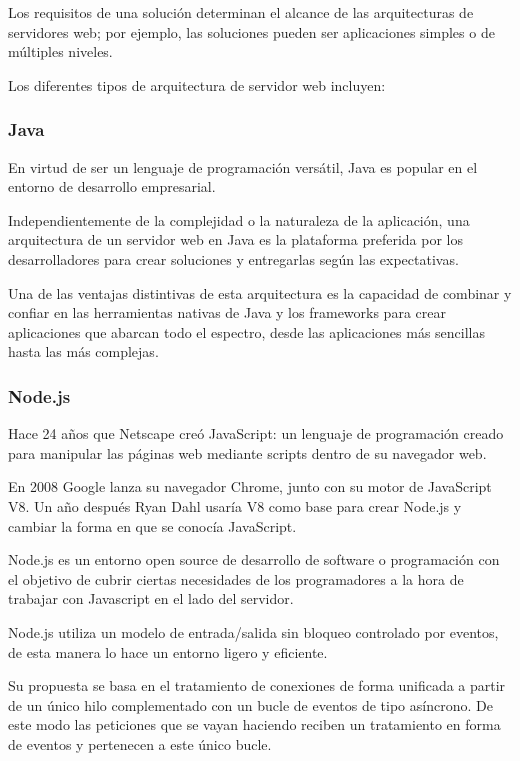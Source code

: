 Los requisitos de una solución determinan el alcance de las arquitecturas de servidores web; por ejemplo, las soluciones pueden ser aplicaciones simples o de múltiples niveles.

Los diferentes tipos de arquitectura de servidor web incluyen:

\subsubsection{Java}

En virtud de ser un lenguaje de programación versátil, Java es popular en el entorno de desarrollo empresarial.

Independientemente de la complejidad o la naturaleza de la aplicación, una arquitectura de un servidor web en Java es la plataforma preferida por los desarrolladores para crear soluciones y entregarlas según las expectativas.

Una de las ventajas distintivas de esta arquitectura es la capacidad de combinar y confiar en las herramientas nativas de Java y los frameworks para crear aplicaciones que abarcan todo el espectro, desde las aplicaciones más sencillas hasta las más complejas.

\subsubsection{Node.js}

Hace 24 años que Netscape creó JavaScript: un lenguaje de programación creado para manipular las páginas web mediante scripts dentro de su navegador web.

En 2008 Google lanza su navegador Chrome, junto con su motor de JavaScript V8. Un año después Ryan Dahl usaría V8 como base para crear Node.js y cambiar la forma en que se conocía JavaScript.

Node.js es un entorno open source de desarrollo de software o programación con el objetivo de cubrir ciertas necesidades de los programadores a la hora de trabajar con Javascript en el lado del servidor.

Node.js utiliza un modelo de entrada/salida sin bloqueo controlado por eventos, de esta manera lo hace un entorno ligero y eficiente.

Su propuesta se basa en el tratamiento de conexiones de forma unificada a partir de un único hilo complementado con un bucle de eventos de tipo asíncrono. De este modo las peticiones que se vayan haciendo reciben un tratamiento en forma de eventos y pertenecen a este único bucle.

